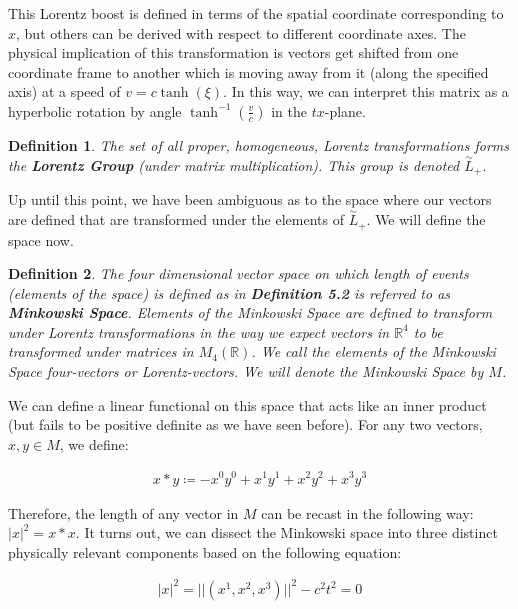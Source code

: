\documentclass[10pt]{ucthesis}
\newcommand{\R}{\mathbb{R}}
\newtheorem{definition}{Definition}[chapter]
\begin{document}
This Lorentz boost is defined in terms of the spatial coordinate corresponding to $x$, but others can be derived with respect to different coordinate axes. The physical implication of this transformation is vectors get shifted from one coordinate frame to another which is moving away from it (along the specified axis) at a speed of $v=c\tanh(\xi)$. In this way, we can interpret this matrix as a hyperbolic rotation by angle $\tanh^{-1}(\frac{v}{c})$ in the $tx$-plane.

\begin{definition}
	The set of all proper, homogeneous, Lorentz transformations forms the \textbf{Lorentz Group} (under matrix multiplication). This group is denoted $\overset{\sim}{L}_+$.
\end{definition}

Up until this point, we have been ambiguous as to the space where our vectors are defined that are transformed under the elements of $\overset{\sim}{L}_+$. We will define the space now.

\begin{definition}
	The four dimensional vector space on which length of events (elements of the space) is defined as in \textbf{Definition 5.2} is referred to as \textbf{Minkowski Space}. Elements of the Minkowski Space are defined to transform under Lorentz transformations in the way we expect vectors in $\R^4$ to be transformed under matrices in $M_4(\R)$. We call the elements of the Minkowski Space four-vectors or Lorentz-vectors. We will denote the Minkowski Space by $M$.
\end{definition}


We can define a linear functional on this space that acts like an inner product (but fails to be positive definite as we have seen before). For any two vectors, $x,y\in M$, we define:

\begin{equation}
\begin{aligned}
	x*y \coloneq -x^0y^0 + x^1y^1 + x^2y^2 + x^3y^3
\end{aligned}
\end{equation}


Therefore, the length of any vector in $M$ can be recast in the following way: $|x|^2 = x*x$. It turns out, we can dissect the Minkowski space into three distinct physically relevant components based on the following equation:

\begin{equation}
\begin{aligned}
	|x|^2 = ||(x^1,x^2,x^3)||^2 - c^2t^2= 0 
\end{aligned}
\end{equation}
\end{document}

